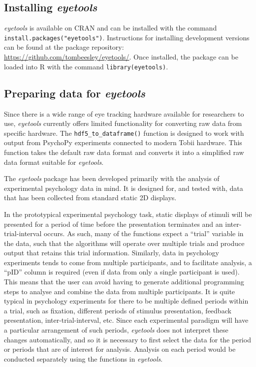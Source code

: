 \documentclass[
  man,
  floatsintext,
  longtable,
  nolmodern,
  notxfonts,
  notimes,
  colorlinks=true,linkcolor=blue,citecolor=blue,urlcolor=blue]{apa7}
\begin{document}
\subsection{\texorpdfstring{Installing
\emph{eyetools}}{Installing eyetools}}\label{installing-eyetools}

\emph{eyetools} is available on CRAN and can be installed with the
command \texttt{install.packages("eyetools")}. Instructions for
installing development versions can be found at the package repository:
\url{https://github.com/tombeesley/eyetools/}. Once installed, the
package can be loaded into R with the command
\texttt{library(eyetools)}.

\subsection{\texorpdfstring{Preparing data for
\emph{eyetools}}{Preparing data for eyetools}}\label{preparing-data-for-eyetools}

Since there is a wide range of eye tracking hardware available for
researchers to use, \emph{eyetools} currently offers limited
functionality for converting raw data from specific hardware. The
\texttt{hdf5\_to\_dataframe()} function is designed to work with output
from PsychoPy experiments connected to modern Tobii hardware. This
function takes the default raw data format and converts it into a
simplified raw data format suitable for \emph{eyetools}.

The \emph{eyetools} package has been developed primarily with the
analysis of experimental psychology data in mind. It is designed for,
and tested with, data that has been collected from standard static 2D
displays.

In the prototypical experimental psychology task, static displays of
stimuli will be presented for a period of time before the presentation
terminates and an inter-trial-interval occurs. As such, many of the
functions expect a ``trial'' variable in the data, such that the
algorithms will operate over multiple trials and produce output that
retains this trial information. Similarly, data in psychology
experiments tends to come from multiple participants, and to facilitate
analysis, a ``pID'' column is required (even if data from only a single
participant is used). This means that the user can avoid having to
generate additional programming steps to analyse and combine the data
from multiple participants. It is quite typical in psychology
experiments for there to be multiple defined periods within a trial,
such as fixation, different periods of stimulus presentation, feedback
presentation, inter-trial-interval, etc. Since each experimental
paradigm will have a particular arrangement of such periods,
\emph{eyetools} does not interpret these changes automatically, and so
it is necessary to first select the data for the period or periods that
are of interest for analysis. Analysis on each period would be conducted
separately using the functions in \emph{eyetools}.
\end{document}
